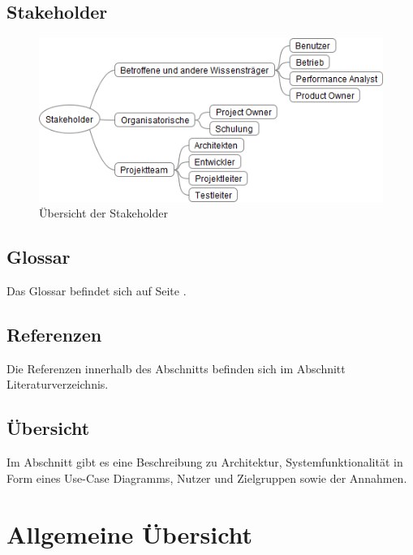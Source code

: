 \subsection{Stakeholder}
 \begin{figure}[H]
  	\centering
    	\includegraphics[width=15cm]{images/stakeholder_analyse}
        	\caption{Übersicht der Stakeholder}
\end{figure}

\subsection{Glossar}
Das Glossar befindet sich auf Seite \pageref{glossar}. 
\subsection{Referenzen}
Die Referenzen innerhalb des Abschnitts  befinden sich im Abschnitt Literaturverzeichnis.
\subsection{Übersicht}
Im Abschnitt  gibt es eine Beschreibung zu Architektur, Systemfunktionalität in Form eines Use-Case Diagramms, Nutzer und Zielgruppen sowie der Annahmen. 

\section{Allgemeine Übersicht}\label{allgemeine_uebersicht}
